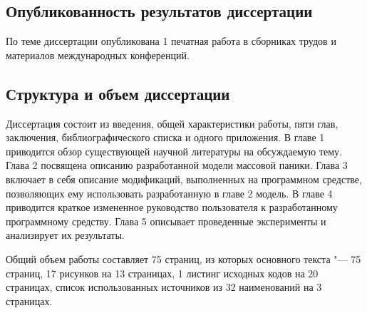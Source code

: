 \subsection*{\textbf{Опубликованность результатов диссертации}}

По теме диссертации опубликована 1 печатная работа в сборниках трудов и материалов международных конференций.

\subsection*{\textbf{Структура и объем диссертации}}

Диссертация состоит из введения, общей характеристики работы, пяти глав, заключения, библиографического списка и одного приложения.
В главе 1 приводится обзор существующей научной литературы на обсуждаемую тему. Глава 2 посвящена описанию разработанной модели массовой паники.
Глава 3 включает в себя описание модификаций, выполненных на программном средстве, позволяющих ему использовать разработанную в главе 2 модель.
В главе 4 приводится краткое измененное руководство пользователя к разработанному программному средству.
Глава 5 описывает проведенные эксперименты и анализирует их результаты.

Общий объем работы составляет 75 страниц, из которых основного текста "--- 75 страниц, 17 рисунков на 13 страницах, 1 листинг исходных кодов на 20 страницах,
список использованных источников из 32 наименований на 3 страницах.

